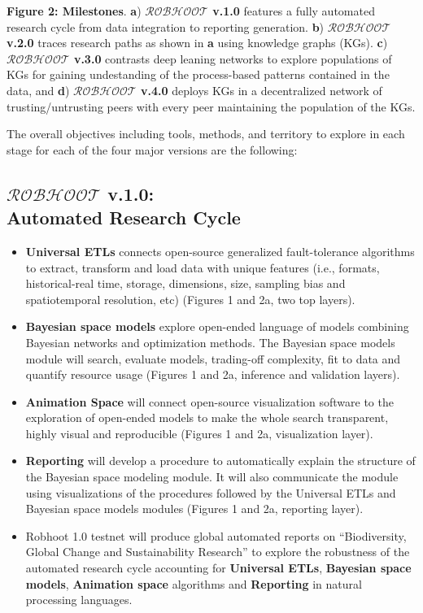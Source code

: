\documentclass[10pt, a4paper, twocolumn]{article} %
\begin{document}
{  {\small {\bf Figure 2: Milestones}. {\bf a}) {\bf
      $\mathcal{ROBHOOT}$ v.1.0} features a fully automated research
    cycle from data integration to reporting generation. {\bf b}) {\bf
      $\mathcal{ROBHOOT}$ v.2.0} traces research paths as shown in
    {\bf a} using knowledge graphs (KGs). {\bf c}) {\bf
      $\mathcal{ROBHOOT}$ v.3.0} contrasts deep leaning networks to
    explore populations of KGs for gaining undestanding of the
    process-based patterns contained in the data, and {\bf d}) {\bf
      $\mathcal{ROBHOOT}$ v.4.0} deploys KGs in a decentralized
    network of trusting/untrusting peers with every peer maintaining
    the population of the KGs.}
  
  The overall objectives including tools, methods, and territory to
  explore in each stage for each of the four major versions are the
  following:
  \subsection{{\bf $\mathcal{ROBHOOT}$ v.1.0}: \\Automated Research Cycle}
   \begin{itemize}
   \item {\bf Universal ETLs} connects open-source generalized
     fault-tolerance algorithms to extract, transform and load data
     with unique features (i.e., formats, historical-real time,
     storage, dimensions, size, sampling bias and spatiotemporal
     resolution, etc) (Figures 1 and 2a, two top layers).
   \item {\bf Bayesian space models} explore open-ended language of
     models combining Bayesian networks and optimization methods. The
     Bayesian space models module will search, evaluate models,
     trading-off complexity, fit to data and quantify resource usage
     (Figures 1 and 2a, inference and validation layers). 
   \item {\bf Animation Space} will connect open-source visualization
     software to the exploration of open-ended models to make the
     whole search transparent, highly visual and reproducible (Figures
     1 and 2a, visualization layer).
   \item {\bf Reporting} will develop a procedure to automatically
     explain the structure of the Bayesian space modeling module. It
     will also communicate the module using visualizations of the
     procedures followed by the Universal ETLs and Bayesian space
     models modules (Figures 1 and 2a, reporting layer).
   \item Robhoot 1.0 testnet will produce global automated reports on
     ``Biodiversity, Global Change and Sustainability Research'' to
     explore the robustness of the automated research cycle accounting
     for {\bf Universal ETLs}, {\bf Bayesian space models}, {\bf
       Animation space} algorithms and {\bf Reporting} in natural
     processing languages.
   \end{itemize}

}
\end{document}
